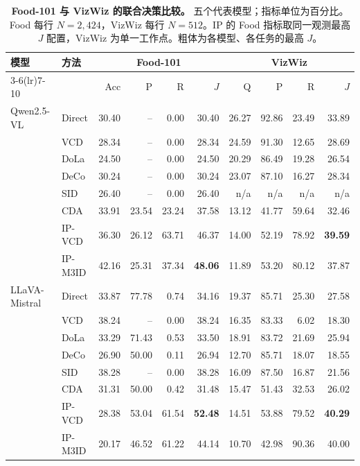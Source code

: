 \begin{table}[t]\centering
\caption{\textbf{Food-101 与 VizWiz 的联合决策比较。} 五个代表模型；指标单位为百分比。Food 每行 $N=2,424$，VizWiz 每行 $N=512$。IP 的 Food 指标取同一观测最高 $J$ 配置，VizWiz 为单一工作点。粗体为各模型、各任务的最高 $J$。}
\label{tab:main}
\fontsize{7.4}{9.0}\selectfont\setlength{\tabcolsep}{4.0pt}
\begin{tabular}{llrrrr@{\hspace{11pt}}rrrr}\toprule
模型 & 方法 & \multicolumn{4}{c}{Food-101} & \multicolumn{4}{c}{VizWiz}\\
\cmidrule(lr){3-6}\cmidrule(lr){7-10}
 & & Acc & P & R & $J$ & Q & P & R & $J$\\\midrule
Qwen2.5-VL & Direct & 30.40 & -- & 0.00 & 30.40 & 26.27 & 92.86 & 23.49 & 33.89\\
 & VCD & 28.34 & -- & 0.00 & 28.34 & 24.59 & 91.30 & 12.65 & 28.69\\
 & DoLa & 24.50 & -- & 0.00 & 24.50 & 20.29 & 86.49 & 19.28 & 26.54\\
 & DeCo & 30.24 & -- & 0.00 & 30.24 & 23.07 & 87.10 & 16.27 & 28.34\\
 & SID & 26.40 & -- & 0.00 & 26.40 & n/a & n/a & n/a & n/a\\
 & CDA & 33.91 & 23.54 & 23.24 & 37.58 & 13.12 & 41.77 & 59.64 & 32.46\\
 & IP-VCD & 36.30 & 26.12 & 63.71 & 46.37 & 14.00 & 52.19 & 78.92 & \textbf{39.59}\\
 & IP-M3ID & 42.16 & 25.31 & 37.34 & \textbf{48.06} & 11.89 & 53.20 & 80.12 & 37.87\\
\addlinespace[3pt]
LLaVA-Mistral & Direct & 33.87 & 77.78 & 0.74 & 34.16 & 19.37 & 85.71 & 25.30 & 27.58\\
 & VCD & 38.24 & -- & 0.00 & 38.24 & 16.35 & 83.33 & 6.02 & 18.30\\
 & DoLa & 33.29 & 71.43 & 0.53 & 33.50 & 18.91 & 83.72 & 21.69 & 25.94\\
 & DeCo & 26.90 & 50.00 & 0.11 & 26.94 & 12.70 & 85.71 & 18.07 & 18.55\\
 & SID & 38.28 & -- & 0.00 & 38.28 & 16.09 & 87.50 & 16.87 & 21.56\\
 & CDA & 31.31 & 50.00 & 0.42 & 31.48 & 15.47 & 51.43 & 32.53 & 26.02\\
 & IP-VCD & 28.38 & 53.04 & 61.54 & \textbf{52.48} & 14.51 & 53.88 & 79.52 & \textbf{40.29}\\
 & IP-M3ID & 20.17 & 46.52 & 61.22 & 44.14 & 10.70 & 42.98 & 90.36 & 40.00\\

\end{tabular}
\end{table}
